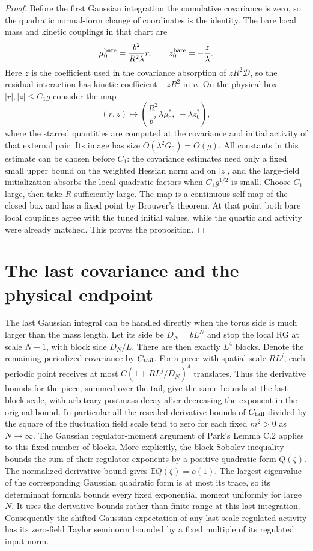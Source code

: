 \documentclass[11pt]{article}
\begin{document}
\begin{proof}
Before the first Gaussian integration the cumulative covariance
is zero, so the quadratic normal-form change of coordinates
is the identity. The bare local mass and kinetic couplings
in that chart are
\[
 \mu_0^{\rm bare}=\frac{b^2}{R^2\lambda}r,
 \qquad
 z_0^{\rm bare}=-\frac{z}{\lambda}.
\]
Here \(z\) is the coefficient used in the covariance absorption
of \(zR^2\mathcal D\), so the residual interaction has
kinetic coefficient \(-zR^2\) in \(u\).
On the physical box \(|r|,|z|\le C_1g\) consider the map
\[
 (r,z)\longmapsto
 \left(\frac{R^2}{b^2}\lambda\mu_0^*,\ -\lambda z_0^*\right),
\]
where the starred quantities are computed at the covariance and
initial activity of that external pair. Its image has size
\(O(\lambda^2G_0)=O(g)\). All constants in this estimate
can be chosen before \(C_1\): the covariance estimates need only
a fixed small upper bound on the weighted Hessian norm and on
\(|z|\), and the large-field initialization absorbs the local
quadratic factors when \(C_1g^{1/2}\) is small. Choose \(C_1\)
large, then take \(R\) sufficiently large. The map is a continuous
self-map of the closed box and has a fixed point by Brouwer's
theorem. At that point both bare local couplings agree with
the tuned initial values, while the quartic and activity
were already matched. This proves the proposition.
\end{proof}


\section{The last covariance and the physical endpoint}\label{sec:finitevolume}

The last Gaussian integral can be handled directly when the
torus side is much larger than the mass length. Let its side be
\(D_N=bL^N\) and stop the local RG at scale \(N-1\), with block side
\(D_N/L\). There are then exactly \(L^4\) blocks. Denote the remaining
periodized covariance by \(C_{\rm tail}\). For a piece with spatial
scale \(RL^j\), each periodic point receives at most
\(C(1+RL^j/D_N)^4\) translates. Thus the derivative bounds for the
piece, summed over the tail, give the same bounds at the last block
scale, with arbitrary postmass decay after decreasing the exponent
in the original bound. In particular all the rescaled derivative
bounds of \(C_{\rm tail}\) divided by the square of the fluctuation
field scale tend to zero for each fixed \(m^2>0\) as \(N\to\infty\).
The Gaussian regulator-moment argument of Park's Lemma C.2
applies to this fixed number of blocks. More explicitly, the block
Sobolev inequality bounds the sum of their regulator exponents by
a positive quadratic form \(Q(\zeta)\). The normalized derivative
bound gives \(\mathbb E Q(\zeta)=o(1)\). The largest eigenvalue
of the corresponding Gaussian quadratic form is at most its trace,
so its determinant formula bounds every fixed exponential moment
uniformly for large \(N\). It uses the derivative
bounds rather than finite range at this last integration.
Consequently the shifted Gaussian expectation of any last-scale
regulated activity has its zero-field Taylor seminorm bounded
by a fixed multiple of its regulated input norm.
\end{document}

